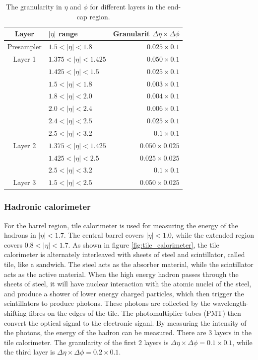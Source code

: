 \begin{table}[htpb]
\centering
\begin{tabular}{|c|l|r|}
\hline
Layer & $|\eta|$ range & Granularit $\Delta \eta \times \Delta \phi$ \\
\hline
\hline
Presampler & $1.5   < |\eta| < 1.8$   & $0.025 \times 0.1$ \\
\hline
Layer 1    & $1.375 < |\eta| < 1.425$ & $0.050 \times 0.1$ \\
           & $1.425 < |\eta| < 1.5$   & $0.025 \times 0.1$ \\
           & $1.5   < |\eta| < 1.8$   & $0.003 \times 0.1$ \\
           & $1.8   < |\eta| < 2.0$   & $0.004 \times 0.1$ \\
           & $2.0   < |\eta| < 2.4$   & $0.006 \times 0.1$ \\
           & $2.4   < |\eta| < 2.5$   & $0.025 \times 0.1$ \\
           & $2.5   < |\eta| < 3.2$   & $0.1   \times 0.1$ \\
\hline
Layer 2    & $1.375 < |\eta| < 1.425$ & $0.050 \times 0.025$ \\
           & $1.425 < |\eta| < 2.5$   & $0.025 \times 0.025$ \\
           & $2.5   < |\eta| < 3.2$   & $0.1   \times 0.1$ \\
\hline
Layer 3    & $1.5   < |\eta| < 2.5$   & $0.050 \times 0.025$ \\
\hline
\end{tabular}
\caption{The granularity in $\eta$ and $\phi$ for different layers in the end-cap region. \cite{ATLAS_doc}}
\label{tab:granularity_EM_endcap}
\end{table}

\subsubsection{Hadronic calorimeter}
For the barrel region, tile calorimeter is used for measuring the energy of the hadrons in $|\eta| < 1.7$.
The central barrel covers $|\eta| < 1.0$, while the extended region covers $0.8 < |\eta| < 1.7$.
As shown in figure \ref{fig:tile_calorimeter}, the tile calorimeter is alternately interleaved with sheets of steel and scintillator, called tile, like a sandwich.
The steel acts as the absorber material, while the scintillator acts as the active material.
When the high energy hadron passes through the sheets of steel, it will have nuclear interaction with the atomic nuclei of the steel, and produce a shower of lower energy charged particles, which then trigger the scintillators to produce photons.
These photons are collected by the wavelength-shifting fibres on the edges of the tile.
The photomultiplier tubes (PMT) then convert the optical signal to the electronic siganl.
By measuring the intensity of the photons, the energy of the hadron can be measured.
There are 3 layers in the tile calorimeter.
The granularity of the first 2 layers is $\Delta \eta \times \Delta \phi = 0.1 \times 0.1$, while the third layer is $\Delta \eta \times \Delta \phi = 0.2 \times 0.1$.

